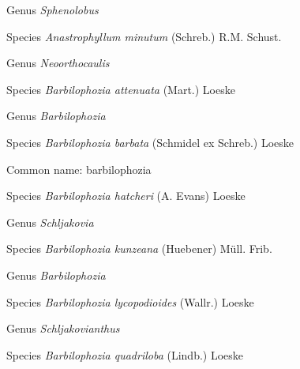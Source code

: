 \documentclass[9pt, article]{memoir}
\begin{document}
\begin{multicols}{2}
\vspace{6pt}\noindent\hspace{30pt}Genus \textit{Sphenolobus}


\vspace{6pt}\noindent\hspace{36pt}Species \textit{Anastrophyllum minutum} (Schreb.) R.M. Schust.


\vspace{6pt}\noindent\hspace{30pt}Genus \textit{Neoorthocaulis}


\vspace{6pt}\noindent\hspace{36pt}Species \textit{Barbilophozia attenuata} (Mart.) Loeske


\vspace{6pt}\noindent\hspace{30pt}Genus \textit{Barbilophozia}


\vspace{6pt}\noindent\hspace{36pt}Species \textit{Barbilophozia barbata} (Schmidel ex Schreb.) Loeske


Common name: barbilophozia

\vspace{6pt}\noindent\hspace{36pt}Species \textit{Barbilophozia hatcheri} (A. Evans) Loeske


\vspace{6pt}\noindent\hspace{30pt}Genus \textit{Schljakovia}


\vspace{6pt}\noindent\hspace{36pt}Species \textit{Barbilophozia kunzeana} (Huebener) Müll. Frib.


\vspace{6pt}\noindent\hspace{30pt}Genus \textit{Barbilophozia}


\vspace{6pt}\noindent\hspace{36pt}Species \textit{Barbilophozia lycopodioides} (Wallr.) Loeske


\vspace{6pt}\noindent\hspace{30pt}Genus \textit{Schljakovianthus}


\vspace{6pt}\noindent\hspace{36pt}Species \textit{Barbilophozia quadriloba} (Lindb.) Loeske



\end{multicols}
\end{document}
